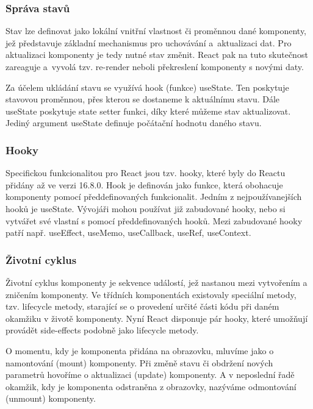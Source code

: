 \subsubsection{Správa stavů}

Stav lze definovat jako lokální vnitřní vlastnost či proměnnou dané komponenty, jež představuje základní mechanismus pro uchovávání a~aktualizaci dat. 
Pro aktualizaci komponenty je tedy nutné stav změnit. React pak na tuto skutečnost zareaguje a~vyvolá tzv. re-render neboli překreslení komponenty s novými daty.

Za účelem ukládání stavu se využívá hook (funkce) useState. Ten poskytuje stavovou proměnnou, přes kterou se dostaneme k aktuálnímu stavu. 
Dále useState poskytuje state setter funkci, díky které můžeme stav aktualizovat. Jediný argument useState definuje počátační hodnotu daného stavu.\cite{reactitnetwork,react}

\subsubsection{Hooky}

Specifickou funkcionalitou pro React jsou tzv. hooky, které byly do Reactu přidány až ve verzi 16.8.0.\cite{reactgithub} 
Hook je definován jako funkce, která obohacuje komponenty pomocí předdefinovaných funkcionalit. Jedním z nejpoužívanejších hooků je useState. 
Vývojáři mohou používat již zabudované hooky, nebo si vytvářet své vlastní s pomocí předdefinovaných hooků. 
Mezi zabudované hooky patří např. useEffect, useMemo, useCallback, useRef, useContext.\cite{react}

\subsubsection{Životní cyklus}

Životní cyklus komponenty je sekvence událostí, jež nastanou mezi vytvořením a zničením komponenty. 
Ve třídních komponentách existovaly speciální metody, tzv. lifecycle metody, starající se o provedení určité části kódu při daném okamžiku v životě komponenty. 
Nyní React disponuje pár hooky, které umožňují provádět side-effects podobně jako lifecycle metody.

O momentu, kdy je komponenta přidána na obrazovku, mluvíme jako o namontování (mount) komponenty. Při změně stavu či obdržení nových parametrů hovoříme o aktualizaci (update) komponenty. 
A v neposlední řadě okamžik, kdy je komponenta odstraněna z obrazovky, nazýváme odmontování (unmount) komponenty.\cite{reactlifecycle, react}

